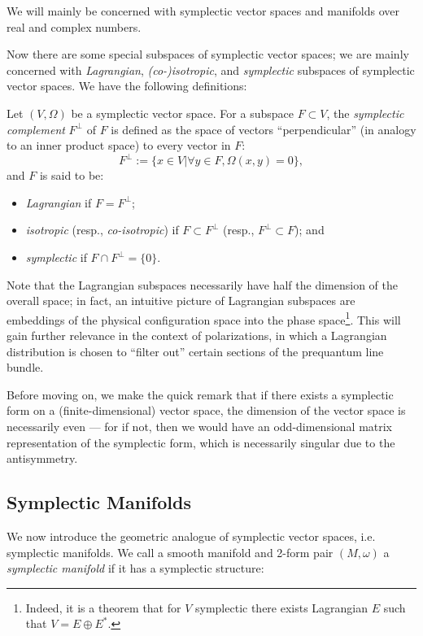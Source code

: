We will mainly be concerned with symplectic vector spaces and manifolds over real and complex numbers.

Now there are some special subspaces of symplectic vector spaces; we are mainly concerned with \emph{Lagrangian}, \emph{(co-)isotropic}, and \emph{symplectic} subspaces of symplectic vector spaces. We have the following definitions:
\begin{defn}
Let $(V,\Omega)$ be a symplectic vector space. For a subspace $F \subset V$, the \emph{symplectic complement} $F^\perp$ of $F$ is defined as the space of vectors ``perpendicular'' (in analogy to an inner product space) to every vector in $F$:
$$
F^{\perp} := \{x \in V | \forall y \in F, \Omega(x,y) = 0 \},
$$
and $F$ is said to be:
\begin{itemize}
\item \emph{Lagrangian} if $F = F^\perp$;

\item \emph{isotropic} (resp., \emph{co-isotropic}) if $F \subset F^\perp$ (resp., $F^\perp \subset F$); and

\item \emph{symplectic} if $F \cap F^\perp = \{0\}$.
\end{itemize}
\end{defn}
Note that the Lagrangian subspaces necessarily have half the dimension of the overall space; in fact, an intuitive picture of Lagrangian subspaces are embeddings of the physical configuration space into the phase space\footnote{Indeed, it is a theorem that for $V$ symplectic there exists Lagrangian $E$ such that $V = E \oplus E^*$.}. This will gain further relevance in the context of polarizations, in which a Lagrangian distribution is chosen to ``filter out'' certain sections of the prequantum line bundle.

Before moving on, we make the quick remark that if there exists a symplectic form on a (finite-dimensional) vector space, the dimension of the vector space is necessarily even --- for if not, then we would have an odd-dimensional matrix representation of the symplectic form, which is necessarily singular due to the antisymmetry.

\subsection{Symplectic Manifolds}
We now introduce the geometric analogue of symplectic vector spaces, i.e. symplectic manifolds. We call a smooth manifold and 2-form pair $(M,\omega)$ a \emph{symplectic manifold} if it has a symplectic structure:

